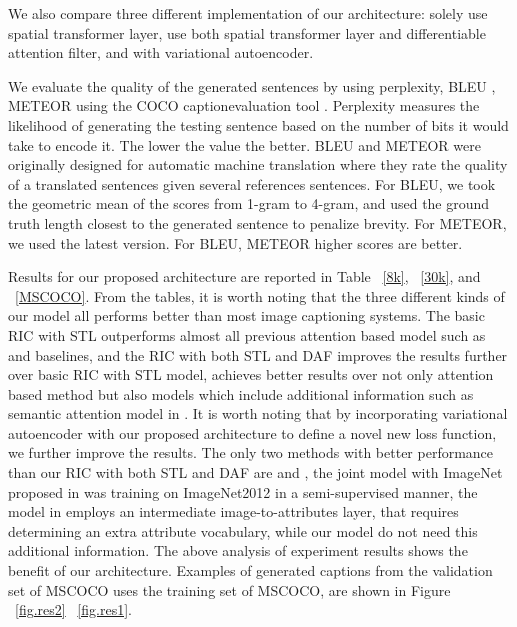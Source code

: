 \documentclass[10pt,twocolumn,letterpaper]{article}
\begin{document}
	We also compare three different implementation of our architecture:  solely use spatial transformer layer, use both spatial transformer layer and differentiable attention filter, and with variational autoencoder.
	
	We evaluate the quality of the generated sentences by using perplexity, BLEU \cite{papineni2002bleu} , METEOR \cite{banerjee2005meteor} using the COCO captionevaluation tool \cite{chen2015microsoft} .
	Perplexity measures the likelihood of generating the testing sentence based on the number of bits it would take to encode it. The lower the value the better.
	BLEU and METEOR were originally designed for automatic  machine translation where they rate the quality of a translated sentences given several references sentences.
	For BLEU, we took the geometric mean of the scores from 1-gram to 4-gram, and used the ground truth length closest to the generated sentence to penalize brevity.
	For METEOR, we used the latest version. For BLEU, METEOR higher scores are better.
	
	
	Results for our proposed architecture are reported in Table ~\ref{8k}, ~\ref{30k}, and ~\ref{MSCOCO}. From the tables, it is worth noting that the three different kinds of our model all performs better than most image captioning systems. The basic RIC with STL outperforms almost all previous attention based model such as \cite{xu2015show} and baselines, and the RIC with both STL and DAF improves the results further over basic RIC with STL model, achieves better results over not only attention based method \cite{xu2015show} but also models which include additional information such as semantic attention model in \cite{you2016image}. It is worth noting that by incorporating variational  autoencoder with our proposed architecture to define a novel new loss function, we further improve the results. The only  two methods with better performance than our RIC with both STL and DAF are \cite{you2016image}  and \cite{wu2015value}, the joint model with ImageNet proposed in \cite{you2016image} was training on ImageNet2012 in a semi-supervised manner, the model in \cite{wu2015value} employs an intermediate image-to-attributes layer, that requires determining an extra attribute vocabulary, while our model do not need this additional information. The above analysis of experiment results shows the benefit of our architecture. Examples of generated captions from the validation set of MSCOCO uses the training set of MSCOCO, are shown in Figure ~\ref{fig.res2} ~\ref{fig.res1}.
	
\end{document}
